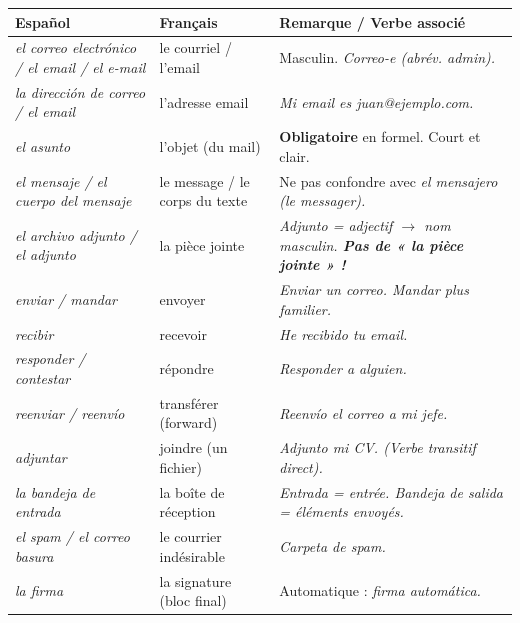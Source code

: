 \documentclass[11pt]{article}
\newcommand{\esp}[1]{\ifmmode\text{\textit{#1}}\else\begingroup\selectlanguage{spanish}\itshape #1\endgroup\fi}
\begin{document}
\begin{center}
\begin{tabularx}{\linewidth}{|X|X|X|}
\hline
\rowcolor{poppurpleL}
\textbf{Español} & \textbf{Français} & \textbf{Remarque / Verbe associé} \\
\hline
\esp{el correo electrónico} / \esp{el email} / \esp{el e-mail} & le courriel / l'email & Masculin. \esp{Correo-e} (abrév. admin). \\
\hline
\esp{la dirección de correo} / \esp{el email} & l'adresse email & \esp{Mi email es juan@ejemplo.com}. \\
\hline
\esp{el asunto} & l'objet (du mail) & \textbf{Obligatoire} en formel. Court et clair. \\
\hline
\esp{el mensaje} / \esp{el cuerpo del mensaje} & le message / le corps du texte & Ne pas confondre avec \esp{el mensajero} (le messager). \\
\hline
\esp{el archivo adjunto} / \esp{el adjunto} & la pièce jointe & \esp{Adjunto} = adjectif $\rightarrow$ nom masculin. \textbf{Pas de « la pièce jointe » !} \\
\hline
\esp{enviar} / \esp{mandar} & envoyer & \esp{Enviar un correo}. \esp{Mandar} plus familier. \\
\hline
\esp{recibir} & recevoir & \esp{He recibido tu email}. \\
\hline
\esp{responder} / \esp{contestar} & répondre & \esp{Responder a alguien}. \textbf{Préposition \esp{a} obligatoire.} \\
\hline
\esp{reenviar} / \esp{reenvío} & transférer (forward) & \esp{Reenvío el correo a mi jefe}. \\
\hline
\esp{adjuntar} & joindre (un fichier) & \esp{Adjunto mi CV}. (Verbe transitif direct). \\
\hline
\esp{la bandeja de entrada} & la boîte de réception & \esp{Entrada} = entrée. \esp{Bandeja de salida} = éléments envoyés. \\
\hline
\esp{el spam} / \esp{el correo basura} & le courrier indésirable & \esp{Carpeta de spam}. \\
\hline
\esp{la firma} & la signature (bloc final) & Automatique : \esp{firma automática}. \\
\hline
\end{tabularx}
\end{center}
\end{document}
